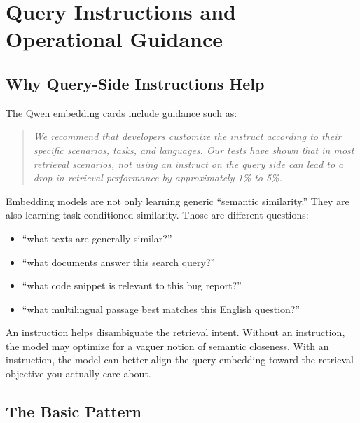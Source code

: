 \chapter{Query Instructions and Operational Guidance}
\label{ch:query-instructions}

\section{Why Query-Side Instructions Help}

The Qwen embedding cards include guidance such as:

\begin{quotation}
\textit{We recommend that developers customize the instruct according to their specific
scenarios, tasks, and languages. Our tests have shown that in most retrieval scenarios, not
using an instruct on the query side can lead to a drop in retrieval performance by
approximately 1\% to 5\%.}
\end{quotation}

Embedding models are not only learning generic ``semantic similarity.'' They are also learning
task-conditioned similarity. Those are different questions:

\begin{itemize}
    \item ``what texts are generally similar?''
    \item ``what documents answer this search query?''
    \item ``what code snippet is relevant to this bug report?''
    \item ``what multilingual passage best matches this English question?''
\end{itemize}

An instruction helps disambiguate the retrieval intent. Without an instruction, the model may
optimize for a vaguer notion of semantic closeness. With an instruction, the model can better
align the query embedding toward the retrieval objective you actually care about.

\section{The Basic Pattern}

